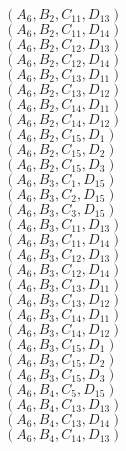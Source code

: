 \documentclass[14pt]{article}
\begin{document}
    $({A}_{6}, {B}_{2}, {C}_{11}, {D}_{13}) $ \\ 
    $({A}_{6}, {B}_{2}, {C}_{11}, {D}_{14}) $ \\ 
    $({A}_{6}, {B}_{2}, {C}_{12}, {D}_{13}) $ \\ 
    $({A}_{6}, {B}_{2}, {C}_{12}, {D}_{14}) $ \\ 
    $({A}_{6}, {B}_{2}, {C}_{13}, {D}_{11}) $ \\ 
    $({A}_{6}, {B}_{2}, {C}_{13}, {D}_{12}) $ \\ 
    $({A}_{6}, {B}_{2}, {C}_{14}, {D}_{11}) $ \\ 
    $({A}_{6}, {B}_{2}, {C}_{14}, {D}_{12}) $ \\ 
    $({A}_{6}, {B}_{2}, {C}_{15}, {D}_{1}) $ \\ 
    $({A}_{6}, {B}_{2}, {C}_{15}, {D}_{2}) $ \\ 
    $({A}_{6}, {B}_{2}, {C}_{15}, {D}_{3}) $ \\ 
    $({A}_{6}, {B}_{3}, {C}_{1}, {D}_{15}) $ \\ 
    $({A}_{6}, {B}_{3}, {C}_{2}, {D}_{15}) $ \\ 
    $({A}_{6}, {B}_{3}, {C}_{3}, {D}_{15}) $ \\ 
    $({A}_{6}, {B}_{3}, {C}_{11}, {D}_{13}) $ \\ 
    $({A}_{6}, {B}_{3}, {C}_{11}, {D}_{14}) $ \\ 
    $({A}_{6}, {B}_{3}, {C}_{12}, {D}_{13}) $ \\ 
    $({A}_{6}, {B}_{3}, {C}_{12}, {D}_{14}) $ \\ 
    $({A}_{6}, {B}_{3}, {C}_{13}, {D}_{11}) $ \\ 
    $({A}_{6}, {B}_{3}, {C}_{13}, {D}_{12}) $ \\ 
    $({A}_{6}, {B}_{3}, {C}_{14}, {D}_{11}) $ \\ 
    $({A}_{6}, {B}_{3}, {C}_{14}, {D}_{12}) $ \\ 
    $({A}_{6}, {B}_{3}, {C}_{15}, {D}_{1}) $ \\ 
    $({A}_{6}, {B}_{3}, {C}_{15}, {D}_{2}) $ \\ 
    $({A}_{6}, {B}_{3}, {C}_{15}, {D}_{3}) $ \\ 
    $({A}_{6}, {B}_{4}, {C}_{5}, {D}_{15}) $ \\ 
    $({A}_{6}, {B}_{4}, {C}_{13}, {D}_{13}) $ \\ 
    $({A}_{6}, {B}_{4}, {C}_{13}, {D}_{14}) $ \\ 
    $({A}_{6}, {B}_{4}, {C}_{14}, {D}_{13}) $ \\ 
\end{document}
